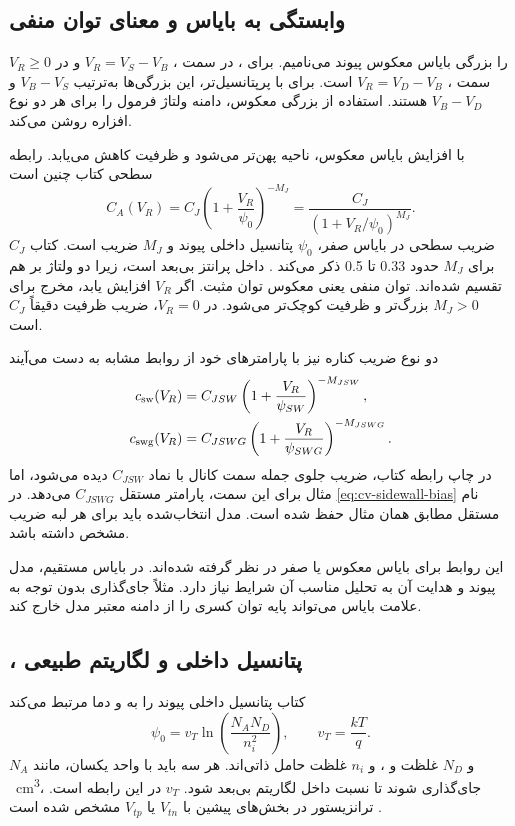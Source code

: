 \subsection{وابستگی به بایاس و معنای توان منفی}
\(V_R\ge0\) را بزرگی بایاس معکوس پیوند می‌نامیم. برای ، در سمت
، \(V_R=V_S-V_B\) و در سمت ، \(V_R=V_D-V_B\) است.
برای  با  پرپتانسیل‌تر، این بزرگی‌ها به‌ترتیب
\(V_B-V_S\) و \(V_B-V_D\) هستند. استفاده از بزرگی معکوس، دامنه ولتاژ فرمول
را برای هر دو نوع افزاره روشن می‌کند.

با افزایش بایاس معکوس، ناحیه  پهن‌تر می‌شود و ظرفیت کاهش می‌یابد.
رابطه سطحی کتاب چنین است
\begin{equation}
 C_A(V_R)=C_J\left(1+\frac{V_R}{\psi_0}\right)^{-M_J}
 =\frac{C_J}{(1+V_R/\psi_0)^{M_J}}.
 \label{eq:cv-area-bias}
\end{equation}
\(C_J\) ضریب سطحی در بایاس صفر، \(\psi_0\) پتانسیل داخلی پیوند و \(M_J\)
ضریب  است. کتاب برای \(M_J\) حدود \num{0.33} تا
\num{0.5} ذکر می‌کند \cite[رابطه ]{weste}.
داخل پرانتز بی‌بعد است، زیرا دو ولتاژ بر هم تقسیم شده‌اند.
توان منفی یعنی معکوس توان مثبت. اگر \(V_R\) افزایش یابد، مخرج برای \(M_J>0\)
بزرگ‌تر و ظرفیت کوچک‌تر می‌شود. در \(V_R=0\)، ضریب ظرفیت دقیقاً \(C_J\) است.

دو نوع ضریب کناره نیز با پارامترهای خود از روابط مشابه به دست می‌آیند
\begin{align}
 c_{\mathrm{sw}}(V_R)
 &=C_{JSW}\left(1+\frac{V_R}{\psi_{SW}}\right)^{-M_{JSW}},\notag\\
 c_{\mathrm{swg}}(V_R)
 &=C_{JSWG}\left(1+\frac{V_R}{\psi_{SWG}}\right)^{-M_{JSWG}}.
 \label{eq:cv-sidewall-bias}
\end{align}
در چاپ رابطه  کتاب، ضریب جلوی جمله سمت کانال با نماد
\(C_{JSW}\) دیده می‌شود، اما مثال  برای این سمت، پارامتر مستقل
\(C_{JSWG}\) می‌دهد. در \eqref{eq:cv-sidewall-bias} نام مستقل مطابق همان
مثال حفظ شده است. مدل انتخاب‌شده باید برای هر لبه ضریب مشخص داشته باشد.

این روابط برای بایاس معکوس یا صفر در نظر گرفته شده‌اند.
در بایاس مستقیم، مدل پیوند و هدایت آن به تحلیل مناسب آن شرایط نیاز دارد.
مثلاً جای‌گذاری بدون توجه به علامت بایاس  می‌تواند پایه توان کسری
را از دامنه معتبر مدل خارج کند.

\subsection{، پتانسیل داخلی و لگاریتم طبیعی}
کتاب پتانسیل داخلی پیوند را به  و دما مرتبط می‌کند
\begin{equation}
 \psi_0=v_T\ln\left(\frac{N_AN_D}{n_i^2}\right),\qquad
 v_T=\frac{kT}{q}.
 \label{eq:cv-built-in}
\end{equation}
\(N_A\) و \(N_D\) غلظت  و ، و \(n_i\) غلظت
حامل ذاتی‌اند. هر سه باید با واحد یکسان، مانند \unit{\per\centi\metre\cubed}،
جای‌گذاری شوند تا نسبت داخل لگاریتم بی‌بعد شود.
\(v_T\) در این رابطه  است.
 ترانزیستور در بخش‌های پیشین با \(V_{tn}\) یا
\(V_{tp}\) مشخص شده است \cite[رابطه ]{weste}.

